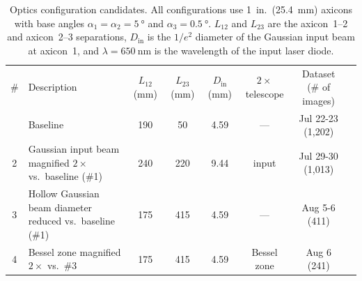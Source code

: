 \documentclass[
  aps,
  twocolumn,
  reprint,              %
  superscriptaddress,
  amsmath,
  amssymb,
  floatfix,
  longbibliography,      %
  nofootinbib %
]{revtex4-2}
\begin{document}
\begin{table}[t]
  \caption{Optics configuration candidates. All configurations use
  1~in.\ (\SI{25.4}{\milli\meter}) axicons with base angles
  $\alpha_{1}=\alpha_{2}=\SI{5}{\degree}$ and
  $\alpha_{3}=\SI{0.5}{\degree}$. $L_{12}$ and $L_{23}$ are the
  axicon~1--2 and axicon~2--3 separations, $D_{\text{in}}$ is the
  $1/e^{2}$ diameter of the Gaussian input beam at axicon~1, and
  $\lambda=\SI{650}{\nano\meter}$ is the wavelength of the input
  laser diode.
  \label{tab:configs}}
  \begin{ruledtabular}
    \begin{tabular}{c>{\raggedright\arraybackslash}p{}cccccc}
      \# & Description                                                 & $L_{12}$ (mm) & $L_{23}$ (mm) & $D_{\text{in}}$ (mm)        & $2\times$ telescope & Dataset (\# of images) \\
      \colrule
      1  & Baseline
         & 190                                                         & \phantom{0}50 & 4.59          & ---                         & Jul 22-23 (1,202)                            \\
      2  & Gaussian input beam magnified $2\times$ vs.\ baseline (\#1)
         & 240                                                         & 220           & 9.44          & input\footnotemark[1]       & Jul 29-30 (1,013)                            \\
      3  & Hollow Gaussian beam diameter reduced vs.\ baseline (\#1)
         & 175                                                         & 415           & 4.59          & ---                         & Aug 5-6 (411)                                \\
      4  & Bessel zone magnified $2\times$ vs.\ \#3
         & 175                                                         & 415           & 4.59          & Bessel zone\footnotemark[2] & Aug 6 (241)                                  \\
    \end{tabular}
  \end{ruledtabular}
\end{table}
\end{document}
